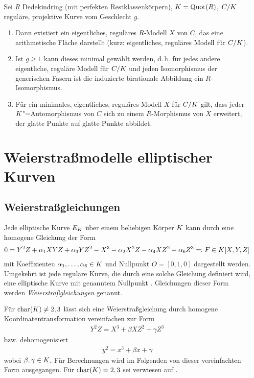 \documentclass[german]{scrreprt}
\begin{document}
\begin{Satz}
  Sei $R$ Dedekindring (mit perfekten Restklassenkörpern),
  $K=\operatorname{Quot}(R)$,
  $C/K$ reguläre, projektive Kurve vom Geschlecht $g$.
  \begin{enumerate}[label=(\roman*)]
  \item Dann existiert ein eigentliches, reguläres $R$-Modell $X$ von $C$,
    das eine arithmetische Fläche darstellt
    (kurz: eigentliches, reguläres Modell für $C/K$).
    \cite[Proposition IV.4.5(a)]{silverman2}
  \item Ist $g\geq1$ kann dieses minimal gewählt werden, d.\,h.
    für jedes andere eigentliche, reguläre Modell für $C/K$ und jeden
    Isomorphismus der generischen Fasern ist die induzierte birationale
    Abbildung
    ein $R$-Isomorphismus.
    \cite[Proposition IV.4.5(b)]{silverman2}
  \item Für ein minimales, eigentliches, reguläres Modell $X$ für $C/K$
    gilt, dass jeder $K$"=Automorphismus von $C$ sich zu einem
    $R$-Morphismus von $X$ erweitert, der glatte Punkte auf glatte
    Punkte abbildet.
    \cite[Proposition IV.4.6]{silverman2}
  \end{enumerate}
\end{Satz}


\section{Weierstraßmodelle elliptischer Kurven}

\subsection{Weierstraßgleichungen}
Jede elliptische Kurve $E_{K}$ über einem beliebigen Körper $K$ kann
durch eine homogene Gleichung der Form
\begin{gather*}
  0 = Y^2 Z + \alpha_1 XYZ + \alpha_3 YZ^2 - X^3 - \alpha_2X^2 Z - \alpha_4 XZ^2 - \alpha_6 Z^3
  \eqqcolon F\in K[X,Y,Z]
\end{gather*}
mit Koeffizienten $\alpha_1,\dotsc,\alpha_6\in K$ und Nullpunkt $O=[0,1,0]$
dargestellt werden. Umgekehrt ist jede reguläre Kurve, die durch eine
solche Gleichung definiert wird, eine elliptische Kurve mit genanntem
Nullpunkt \cite[Proposition III.3.1]{silverman}.
Gleichungen dieser Form werden \emph{Weierstraßgleichungen} genannt.

Für $\operatorname{char}(K)\neq 2,3$ lässt sich eine Weierstraßgleichung durch
homogene Koordinatentransformation vereinfachen zur Form
\begin{gather*}
  Y^2 Z = X^3 + \beta XZ^2 + \gamma Z^3
\end{gather*}
bzw. dehomogenisiert
\begin{gather*}
  y^2 = x^3 + \beta x + \gamma
\end{gather*}
wobei $\beta,\gamma\in K$.
Für Berechnungen wird im Folgenden von dieser vereinfachten Form
ausgegangen. Für $\operatorname{char}(K)=2,3$ sei verwiesen auf
\cite[Appendix: Elliptic Curves in Characteristics 2 and 3]{silverman}.
\end{document}
